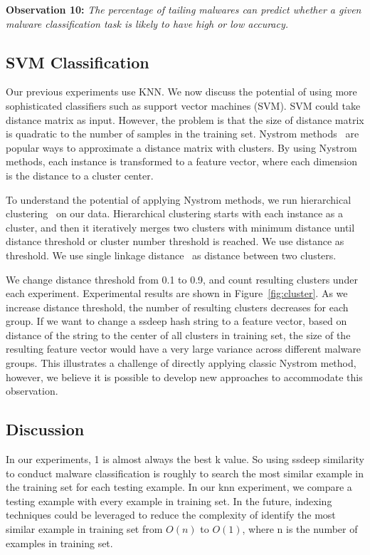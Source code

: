 {\bf Observation 10:} 
{\em The percentage of tailing malwares
can predict whether a given malware classification task is likely to have high or low accuracy.}



\subsection{SVM Classification}
Our previous experiments use KNN.
We now discuss the potential of using
more sophisticated classifiers such as
support vector machines (SVM). 
SVM could take distance matrix as input.
However, the problem is that the size of distance matrix is quadratic to the number of samples in the training set. 
Nystrom methods~\cite{clustering-purpose} are popular ways to
approximate a distance matrix with clusters.
By using Nystrom methods, each instance is transformed to a feature vector, where each dimension is the distance to a cluster center. 

To understand the potential of applying Nystrom methods, we run hierarchical clustering~\cite{hcluster} on our data.
Hierarchical clustering starts with each instance as a cluster, 
and then it iteratively merges two clusters with minimum distance 
until distance threshold or cluster number threshold is reached. 
We use distance as threshold. 
We use single linkage distance~\cite{single-link} as distance between two clusters. 

We change distance threshold from 0.1 to 0.9, 
and count resulting clusters under each experiment. 
Experimental results are shown in Figure~\ref{fig:cluster}. 
As we increase distance threshold, the number of resulting clusters decreases for each group. 
If we want to change a ssdeep hash string to a feature vector, 
based on distance of the string to the center of all clusters in training set, 
the size of the resulting feature vector would have a very large variance across different malware groups. 
This illustrates a challenge of directly applying
classic Nystrom method, however, we believe
it is possible to develop new approaches to
accommodate this observation.


\subsection{Discussion}

In our experiments, 1 is almost always the best k value. 
So using ssdeep similarity to conduct malware classification 
is roughly to search the most similar example in the training set for each testing example.
In our knn experiment, we compare a testing example with every example in training set. 
In the future, indexing techniques could be leveraged to reduce the complexity of identify 
the most similar example in training set from $O(n)$ to $O(1)$, where n is the number of examples in training set. 


